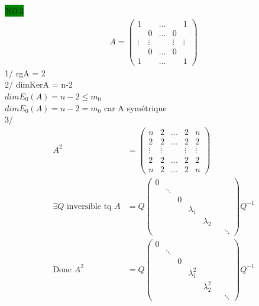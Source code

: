 \documentclass{article}
\begin{document}
\noindent \colorbox{green}{260.3}\\
\begin{align*}
    A = \begin{pmatrix}
        1 & & ... & & 1\\
         & 0 & ... & 0 & \\
        \vdots & \vdots &  & \vdots & \vdots \\
         & 0 & ... & 0 & \\
        1 & & ... & & 1
    \end{pmatrix}
\end{align*}
1/ rgA = 2\\
2/ dimKerA = n-2\\
\(dimE_0(A) = n-2 \leq m_0 \)\\
\(dimE_0(A) = n-2 = m_0 \) car A symétrique\\
3/ \begin{align*}
    A^2 &= \begin{pmatrix}
        n &2 & ... &2& n\\
         2& 2 & ... & 2 & 2\\
        \vdots & \vdots &  & \vdots & \vdots \\
         2& 2 & ... & 2 & 2\\
        n& 2& ... &2 & n
    \end{pmatrix}\\
    \exists Q \text{ inversible tq } A &= Q \begin{pmatrix}
        0 & & &  \\
          & \ddots & & & \\
          & & 0 & & \\
          & & & \lambda_1 & \\
          & & & & \lambda_2 & \\
          & & & & & & \ddots
    \end{pmatrix}Q^{-1}\\
    \text{Donc } A^2 &= Q \begin{pmatrix}
        0 & & &  \\
          & \ddots & & & \\
          & & 0 & & \\
          & & & \lambda_1^2 & \\
          & & & & \lambda_2^2 & \\
          & & & & & & \ddots
    \end{pmatrix}Q^{-1}
\end{align*}
\end{document}
